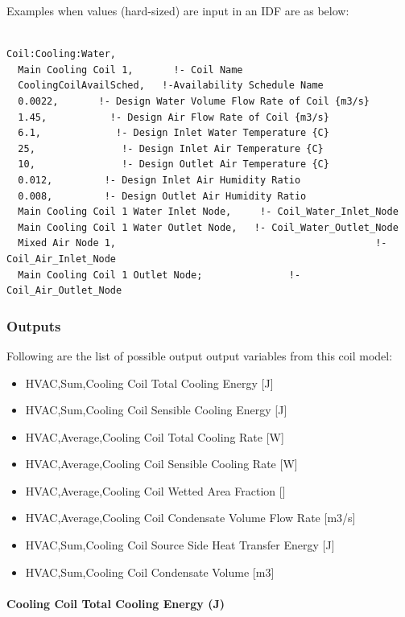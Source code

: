 Examples when values (hard-sized) are input in an IDF are as below:

\begin{lstlisting}

Coil:Cooling:Water,
  Main Cooling Coil 1,       !- Coil Name
  CoolingCoilAvailSched,   !-Availability Schedule Name
  0.0022,       !- Design Water Volume Flow Rate of Coil {m3/s}
  1.45,           !- Design Air Flow Rate of Coil {m3/s}
  6.1,             !- Design Inlet Water Temperature {C}
  25,               !- Design Inlet Air Temperature {C}
  10,               !- Design Outlet Air Temperature {C}
  0.012,         !- Design Inlet Air Humidity Ratio
  0.008,         !- Design Outlet Air Humidity Ratio
  Main Cooling Coil 1 Water Inlet Node,     !- Coil_Water_Inlet_Node
  Main Cooling Coil 1 Water Outlet Node,   !- Coil_Water_Outlet_Node
  Mixed Air Node 1,                                             !- Coil_Air_Inlet_Node
  Main Cooling Coil 1 Outlet Node;               !- Coil_Air_Outlet_Node
\end{lstlisting}

\subsubsection{Outputs}\label{outputs-015}

Following are the list of possible output output variables from this coil model:

\begin{itemize}
\item
  HVAC,Sum,Cooling Coil Total Cooling Energy {[}J{]}
\item
  HVAC,Sum,Cooling Coil Sensible Cooling Energy {[}J{]}
\item
  HVAC,Average,Cooling Coil Total Cooling Rate {[}W{]}
\item
  HVAC,Average,Cooling Coil Sensible Cooling Rate {[}W{]}
\item
  HVAC,Average,Cooling Coil Wetted Area Fraction {[]}
\item
  HVAC,Average,Cooling Coil Condensate Volume Flow Rate {[}m3/s{]}
\item
  HVAC,Sum,Cooling Coil Source Side Heat Transfer Energy {[}J{]}
\item
  HVAC,Sum,Cooling Coil Condensate Volume {[}m3{]}
\end{itemize}

\paragraph{Cooling Coil Total Cooling Energy (J)}\label{cooling-coil-total-cooling-energy-j}

